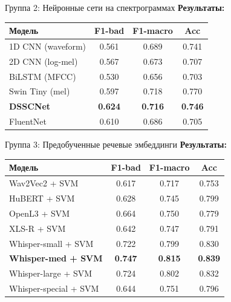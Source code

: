 \documentclass[aspectratio=169]{beamer}
\begin{document}
\begin{frame}{Группа 2: Нейронные сети на спектрограммах}
  \textbf{Результаты:}\\[0.3em]
  \setlength{\tabcolsep}{4pt}
  \begin{tabular}{lccc}
    \toprule
    \textbf{Модель} & \textbf{F1-bad} & \textbf{F1-macro} & \textbf{Acc} \\
    \midrule
    1D CNN (waveform)        & 0.561 & 0.689 & 0.741 \\
    2D CNN (log-mel)         & 0.567 & 0.673 & 0.707 \\
    BiLSTM (MFCC)            & 0.530 & 0.656 & 0.703 \\
    Swin Tiny (mel)          & 0.597 & 0.718 & 0.770 \\
    \textbf{DSSCNet}         & \textbf{0.624} & \textbf{0.716} & \textbf{0.746} \\
    FluentNet                & 0.610 & 0.686 & 0.705 \\
    \bottomrule
  \end{tabular}
\end{frame}

\begin{frame}{Группа 3: Предобученные речевые эмбеддинги}
  \textbf{Результаты:}\\[0.2em]
  \setlength{\tabcolsep}{4pt}
  \begin{tabular}{lccc}
    \toprule
    \textbf{Модель} & \textbf{F1-bad} & \textbf{F1-macro} & \textbf{Acc} \\
    \midrule
    Wav2Vec2 + SVM                    & 0.617 & 0.717 & 0.753 \\
    HuBERT + SVM                     & 0.628 & 0.745 & 0.799 \\
    OpenL3 + SVM                      & 0.664 & 0.750 & 0.779 \\
    XLS-R + SVM                       & 0.642 & 0.747 & 0.791 \\
    Whisper-small + SVM               & 0.722 & 0.799 & 0.830 \\
    \textbf{Whisper-med + SVM}        & \textbf{0.747} & \textbf{0.815} & \textbf{0.839} \\
    Whisper-large + SVM               & 0.724 & 0.802 & 0.832 \\
    Whisper-special + SVM             & 0.644 & 0.751 & 0.796 \\
    \bottomrule
  \end{tabular}
\end{frame}
\end{document}
